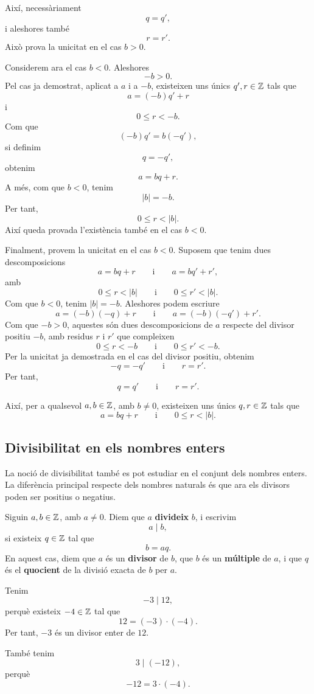 \begin{prova}
Així, necessàriament
\[
q=q',
\]
i aleshores també
\[
r=r'.
\]
Això prova la unicitat en el cas $b>0$.

Considerem ara el cas $b<0$. Aleshores
\[
-b>0.
\]
Pel cas ja demostrat, aplicat a $a$ i a $-b$, existeixen uns únics $q',r\in\mathbb{Z}$ tals que
\[
a=(-b)q'+r
\]
i
\[
0\leq r<-b.
\]
Com que
\[
(-b)q'=b(-q'),
\]
si definim
\[
q=-q',
\]
obtenim
\[
a=bq+r.
\]
A més, com que $b<0$, tenim
\[
|b|=-b.
\]
Per tant,
\[
0\leq r<|b|.
\]
Així queda provada l'existència també en el cas $b<0$.

Finalment, provem la unicitat en el cas $b<0$. Suposem que tenim dues descomposicions
\[
a=bq+r
\qquad\text{i}\qquad
a=bq'+r',
\]
amb
\[
0\leq r<|b|
\qquad\text{i}\qquad
0\leq r'<|b|.
\]
Com que $b<0$, tenim $|b|=-b$. Aleshores podem escriure
\[
a=(-b)(-q)+r
\qquad\text{i}\qquad
a=(-b)(-q')+r'.
\]
Com que $-b>0$, aquestes són dues descomposicions de $a$ respecte del divisor positiu $-b$, amb residus $r$ i $r'$ que compleixen
\[
0\leq r<-b
\qquad\text{i}\qquad
0\leq r'<-b.
\]
Per la unicitat ja demostrada en el cas del divisor positiu, obtenim
\[
-q=-q'
\qquad\text{i}\qquad
r=r'.
\]
Per tant,
\[
q=q'
\qquad\text{i}\qquad
r=r'.
\]

Així, per a qualsevol $a,b\in\mathbb{Z}$, amb $b\neq 0$, existeixen uns únics $q,r\in\mathbb{Z}$ tals que
\[
a=bq+r
\qquad\text{i}\qquad
0\leq r<|b|.
\]
\end{prova}

\subsection{Divisibilitat en els nombres enters}

La noció de divisibilitat també es pot estudiar en el conjunt dels nombres enters. La diferència principal respecte dels nombres naturals és que ara els divisors poden ser positius o negatius.

\begin{definicio}[Divisibilitat en $\Z$]\label{def:divisibilitat-enters}
Siguin $a,b\in\mathbb{Z}$, amb $a\neq 0$. Diem que $a$ \textbf{divideix} $b$, i escrivim
\[
a\mid b,
\]
si existeix $q\in\mathbb{Z}$ tal que
\[
b=aq.
\]
En aquest cas, diem que $a$ és un \textbf{divisor} de $b$, que $b$ és un \textbf{múltiple} de $a$, i que $q$ és el \textbf{quocient} de la divisió exacta de $b$ per $a$.
\end{definicio}

\begin{exemple}
Tenim
\[
-3\mid 12,
\]
perquè existeix $-4\in\mathbb{Z}$ tal que
\[
12=(-3)\cdot(-4).
\]
Per tant, $-3$ és un divisor enter de $12$.

També tenim
\[
3\mid (-12),
\]
perquè
\[
-12=3\cdot(-4).
\]
\end{exemple}

